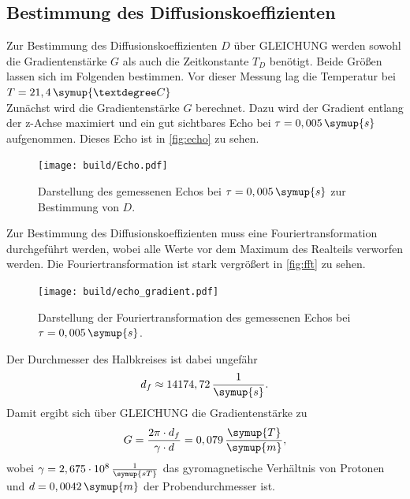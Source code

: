 \subsection{Bestimmung des Diffusionskoeffizienten}
Zur Bestimmung des Diffusionskoeffizienten $D$ über GLEICHUNG werden sowohl die Gradientenstärke $G$
als auch die Zeitkonstante $T_D$ benötigt. Beide Größen lassen sich im Folgenden bestimmen.
Vor dieser Messung lag die Temperatur bei $T = 21,4 \, \symup{°C}$\\

Zunächst wird die Gradientenstärke $G$ berechnet. Dazu wird der Gradient entlang der z-Achse maximiert und 
ein gut sichtbares Echo bei $\tau = 0,005\, \symup{s}$ aufgenommen. Dieses Echo ist in \autoref{fig:echo}
zu sehen.
\begin{figure}
    \centering
    \texttt{[image: build/Echo.pdf]}
    \caption{Darstellung des gemessenen Echos bei $\tau = 0,005\,\symup{s}$ zur Bestimmung von $D$.}
    \label{fig:echo}
\end{figure}
Zur Bestimmung des Diffusionskoeffizienten muss eine Fouriertransformation durchgeführt werden, wobei 
alle Werte vor dem Maximum des Realteils verworfen werden. Die Fouriertransformation ist stark vergrößert 
in \autoref{fig:fft} zu sehen.
\begin{figure}
    \centering
    \texttt{[image: build/echo\_gradient.pdf]}
    \caption{Darstellung der Fouriertransformation des gemessenen Echos bei $\tau = 0,005\,\symup{s}$.}
    \label{fig:fft}
\end{figure}
Der Durchmesser des Halbkreises ist dabei ungefähr
\begin{equation*}
    d_f \approx 14174,72 \,\frac{1}{\symup{s}}.
\end{equation*}
Damit ergibt sich über GLEICHUNG die Gradientenstärke zu 
\begin{equation*}
    G = \frac{2 \pi \cdot d_f}{\gamma \cdot d} = 0,079 \, \frac{\symup{T}}{\symup{m}},
\end{equation*}
wobei $\gamma = 2,675 \cdot 10^{8} \, \frac{1}{\symup{s T}}$ das gyromagnetische Verhältnis von Protonen\cite{gamma} und 
$d = 0,0042\,\symup{m}$ der Probendurchmesser ist.\\

